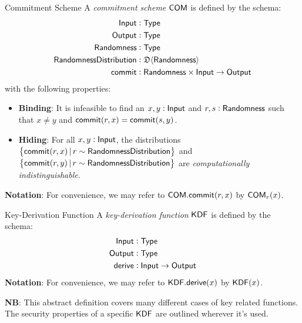 \begin{definitiontoc}{Commitment Scheme}
    A \emph{commitment scheme} ${\textsf{COM}}$ is defined by the schema:
    \begin{align*}
        {\textsf{Input}}                  &: {\textsf{Type}} \\
        {\textsf{Output}}                 &: {\textsf{Type}} \\
        {\textsf{Randomness}}             &: {\textsf{Type}} \\
        {\textsf{RandomnessDistribution}} &: \mathfrak{D}\langle{{\textsf{Randomness}}}\rangle \\
        {\textsf{commit}}                 &: {\textsf{Randomness}} \times {\textsf{Input}} \to {\textsf{Output}}
    \end{align*}
    with the following properties:
    \begin{itemize}
        \item \textbf{Binding}: It is infeasible to find an $x, y : {\textsf{Input}}$ and $r, s: {\textsf{Randomness}}$ such that $x \ne y$ and ${\textsf{commit}}(r,x) = {\textsf{commit}}(s,y)$.
        \item \textbf{Hiding}: For all $x, y : {\textsf{Input}}$, the distributions $\set{{\textsf{commit}}(r,x) \,|\, r \sim {\textsf{RandomnessDistribution}}}$ and \\ $\set{{\textsf{commit}}(r,y) \,|\, r \sim {\textsf{RandomnessDistribution}}}$ are \emph{computationally indistinguishable}.
    \end{itemize}

    \textbf{Notation}: For convenience, we may refer to ${\textsf{COM}}.{\textsf{commit}}(r,x)$ by ${\textsf{COM}}_r(x)$.
\end{definitiontoc}

\begin{definitiontoc}{Key-Derivation Function}
    A \emph{key-derivation function} ${\textsf{KDF}}$ is defined by the schema:
    \begin{align*}
        {\textsf{Input}}  &: {\textsf{Type}} \\
        {\textsf{Output}} &: {\textsf{Type}} \\
        {\textsf{derive}} &: {\textsf{Input}} \to {\textsf{Output}}
    \end{align*}
    \textbf{Notation}: For convenience, we may refer to ${\textsf{KDF}}.{\textsf{derive}}(x)$ by ${\textsf{KDF}}(x)$.

    \textbf{NB}: This abstract definition covers many different cases of key related functions. The security properties of a specific ${\textsf{KDF}}$ are outlined wherever it's used.
\end{definitiontoc}

